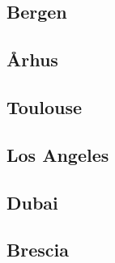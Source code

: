 \subsection{Bergen}


\subsection{Århus}


\subsection{Toulouse}


\subsection{Los Angeles}


\subsection{Dubai}


\subsection{Brescia}






\begin{landscape}

\end{landscape}

